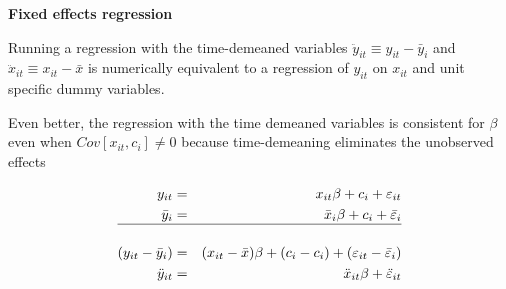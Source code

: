 \documentclass[notes=show]{beamer}
\begin{document}
\begin{frame}[plain]
	\begin{center}
	\textbf{Fixed effects regression}
	\end{center}
	
Running a regression with the time-demeaned variables $\ddot{y}_{it}\equiv y_{it} - \bar{y}_i$ and $\ddot{x}_{it} \equiv x_{it} - \bar{x}$ is numerically equivalent to a regression of $y_{it}$ on $x_{it}$ and unit specific dummy variables.

\vspace{10mm}

Even better, the regression with the time demeaned variables is consistent for $\beta$ even when $Cov[x_{it},c_i]\neq 0$ because time-demeaning eliminates the unobserved effects

\begin{eqnarray*}
y_{it} &=& x_{it}\beta + c_i + \varepsilon_{it} \\
\bar{y}_i &=& \bar{x}_i \beta + c_i + \bar{\varepsilon}_{i}\\
\hline \\
(y_{it} - \bar{y}_i) &=& (x_{it} - \bar{x})\beta + (c_i - c_i) + (\varepsilon_{it} - \bar{\varepsilon}_i) \\
\ddot{y}_{it} &=& \ddot{x}_{it}\beta + \ddot{\varepsilon}_{it}
\end{eqnarray*}

\end{frame}
\end{document}

